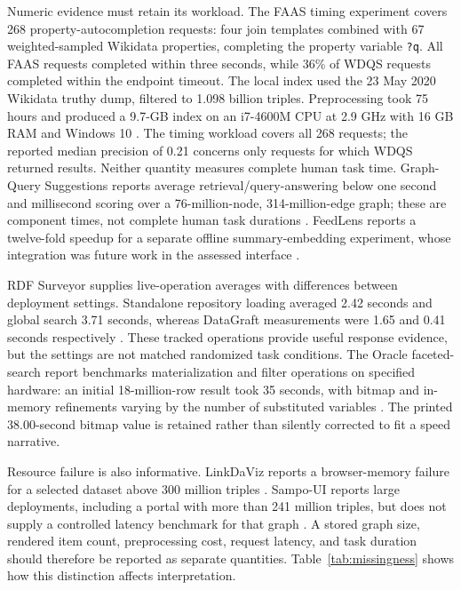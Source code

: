 \documentclass[manuscript,review,screen]{acmart}
\begin{document}
Numeric evidence must retain its workload. The FAAS timing experiment covers 268 property-autocompletion requests: four join templates combined with 67 weighted-sampled Wikidata properties, completing the property variable \texttt{?q}. All FAAS requests completed within three seconds, while 36\% of WDQS requests completed within the endpoint timeout. The local index used the 23 May 2020 Wikidata truthy dump, filtered to 1.098 billion triples. Preprocessing took 75 hours and produced a 9.7-GB index on an i7-4600M CPU at 2.9 GHz with 16 GB RAM and Windows 10 \citep{2021_Parra_Fast_Approximate}. The timing workload covers all 268 requests; the reported median precision of 0.21 concerns only requests for which WDQS returned results. Neither quantity measures complete human task time. Graph-Query Suggestions reports average retrieval/query-answering below one second and millisecond scoring over a 76-million-node, 314-million-edge graph; these are component times, not complete human task durations \citep{2020_Lissandrini_Graph-Query_Suggestions}. FeedLens reports a twelve-fold speedup for a separate offline summary-embedding experiment, whose integration was future work in the assessed interface \citep{V3-01126}.

RDF Surveyor supplies live-operation averages with differences between deployment settings. Standalone repository loading averaged 2.42 seconds and global search 3.71 seconds, whereas DataGraft measurements were 1.65 and 0.41 seconds respectively \citep{V3-01765}. These tracked operations provide useful response evidence, but the settings are not matched randomized task conditions. The Oracle faceted-search report benchmarks materialization and filter operations on specified hardware: an initial 18-million-row result took 35 seconds, with bitmap and in-memory refinements varying by the number of substituted variables \citep{V3-01056}. The printed 38.00-second bitmap value is retained rather than silently corrected to fit a speed narrative.

Resource failure is also informative. LinkDaViz reports a browser-memory failure for a selected dataset above 300 million triples \citep{2015_Thellmann_LinkDaViz_Automatic}. Sampo-UI reports large deployments, including a portal with more than 241 million triples, but does not supply a controlled latency benchmark for that graph \citep{2022_Ikkala_Sampo-UI_A}. A stored graph size, rendered item count, preprocessing cost, request latency, and task duration should therefore be reported as separate quantities. Table~\ref{tab:missingness} shows how this distinction affects interpretation.
\end{document}

